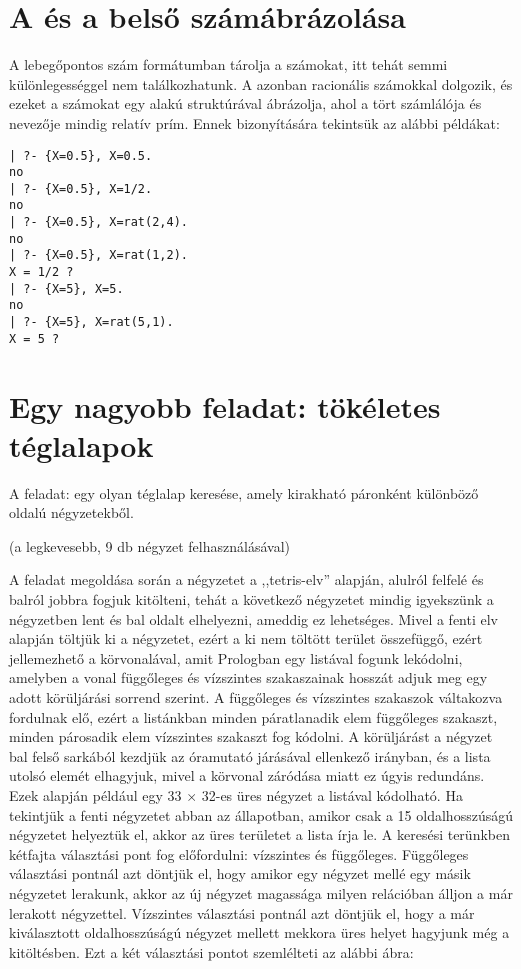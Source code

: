 \section{A \clpq és a \clpr belső számábrázolása}

A \clpr lebegőpontos szám formátumban tárolja a számokat, itt tehát
semmi különlegességgel nem találkozhatunk. A \clpq azonban racionális
számokkal dolgozik, és ezeket a számokat egy 
alakú struktúrával ábrázolja, ahol a tört számlálója és nevezője mindig
relatív prím. Ennek bizonyítására tekintsük az alábbi \clpq példákat:

\begin{verbatim}
| ?- {X=0.5}, X=0.5.
no
| ?- {X=0.5}, X=1/2.
no
| ?- {X=0.5}, X=rat(2,4).
no
| ?- {X=0.5}, X=rat(1,2).
X = 1/2 ?
| ?- {X=5}, X=5.
no
| ?- {X=5}, X=rat(5,1).
X = 5 ?
\end{verbatim}

\section{Egy nagyobb \clpq feladat: tökéletes téglalapok}

\label{teglalap:clpqr}

A feladat: egy olyan téglalap keresése, amely kirakható páronként különböző
oldalú négyzetekből.

(a legkevesebb, 9 db négyzet felhasználásával)
\begin{center}
\end{center}

A feladat megoldása során a négyzetet a ,,tetris-elv'' alapján, alulról
felfelé és balról jobbra fogjuk kitölteni, tehát a következő négyzetet
mindig igyekszünk a négyzetben lent és bal oldalt elhelyezni, ameddig
ez lehetséges. Mivel a fenti elv alapján töltjük ki a négyzetet, ezért a
ki nem töltött terület összefüggő, ezért jellemezhető a körvonalával, amit
Prologban egy listával fogunk lekódolni, amelyben a vonal függőleges és
vízszintes szakaszainak hosszát adjuk meg egy adott körüljárási sorrend
szerint. A függőleges és vízszintes szakaszok váltakozva fordulnak elő,
ezért a listánkban minden páratlanadik elem függőleges szakaszt, minden
párosadik elem vízszintes szakaszt fog kódolni. A körüljárást a négyzet
bal felső sarkából kezdjük az óramutató járásával ellenkező irányban, és
a lista utolsó elemét elhagyjuk, mivel a körvonal záródása miatt ez úgyis
redundáns. Ezek alapján például egy 33 $\times$ 32-es üres négyzet a
\cd{[-32,33,32]} listával kódolható. Ha tekintjük a fenti négyzetet abban
az állapotban, amikor csak a 15 oldalhosszúságú négyzetet helyeztük el,
akkor az üres területet a \cd{[-17,15,-15,18,32]} lista írja le.
\br
A keresési terünkben kétfajta választási pont fog előfordulni: vízszintes
és függőleges. Függőleges választási pontnál azt döntjük el, hogy amikor
egy négyzet mellé egy másik négyzetet lerakunk, akkor az új négyzet magassága
milyen relációban álljon a már lerakott négyzettel. Vízszintes választási
pontnál azt döntjük el, hogy a már kiválasztott oldalhosszúságú négyzet
mellett mekkora üres helyet hagyjunk még a kitöltésben. Ezt a két választási
pontot szemlélteti az alábbi ábra:

